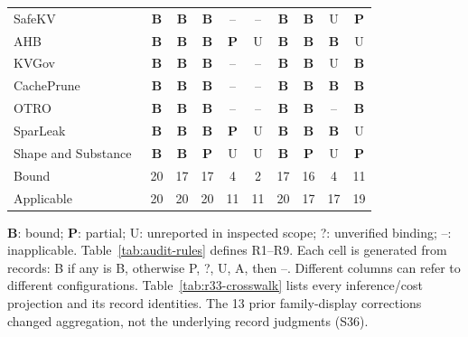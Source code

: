 \begin{table}[t]
\begin{tabularx}{\columnwidth}{@{}Y*{9}{c}@{}}
SafeKV~\cite{chu2025safekv} & \textbf{B} & \textbf{B} & \textbf{B} & -- & -- & \textbf{B} & \textbf{B} & U & \textbf{P}\\
AHB~\cite{zhu2026turing} & \textbf{B} & \textbf{B} & \textbf{B} & \textbf{P} & U & \textbf{B} & \textbf{B} & \textbf{B} & U\\
KVGov~\cite{addagada2026kvgov} & \textbf{B} & \textbf{B} & \textbf{B} & -- & -- & \textbf{B} & \textbf{B} & U & \textbf{B}\\
CachePrune~\cite{wu2026cacheprune} & \textbf{B} & \textbf{B} & \textbf{B} & -- & -- & \textbf{B} & \textbf{B} & \textbf{B} & \textbf{B}\\
OTRO~\cite{lee2026otro} & \textbf{B} & \textbf{B} & \textbf{B} & -- & -- & \textbf{B} & \textbf{B} & -- & \textbf{B}\\
SparLeak~\cite{chen2026sparleak} & \textbf{B} & \textbf{B} & \textbf{B} & \textbf{P} & U & \textbf{B} & \textbf{B} & \textbf{B} & U\\
Shape and Substance~\cite{hadad2026shape} & \textbf{B} & \textbf{B} & \textbf{P} & U & U & \textbf{B} & \textbf{P} & U & \textbf{P}\\
\midrule Bound & 20 & 17 & 17 & 4 & 2 & 17 & 16 & 4 & 11\\
Applicable & 20 & 20 & 20 & 11 & 11 & 20 & 17 & 17 & 19\\
\bottomrule\end{tabularx}
\par\smallskip\raggedright \textbf{B}: bound; \textbf{P}: partial; U: unreported in inspected scope; ?: unverified binding; --: inapplicable. Table~\ref{tab:audit-rules} defines R1--R9. Each cell is generated from records: B if any is B, otherwise P, ?, U, A, then --. Different columns can refer to different configurations. Table~\ref{tab:r33-crosswalk} lists every inference/cost projection and its record identities. The 13 prior family-display corrections changed aggregation, not the underlying record judgments (S36).
\end{table}
